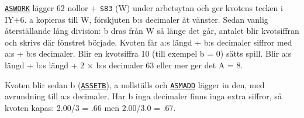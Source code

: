 \begin{Listing}
\Gap
{}
\begin{Note}\par\noindent \hyperlink{l:ASWORK}{\texttt{ASWORK}} lägger 62 nollor + \texttt{\$83} (W) under arbetsytan och ger kvotens tecken i IY+6. a kopieras till W, förskjuten b:s decimaler åt vänster. Sedan vanlig återställande lång division: b dras från W så länge det går, antalet blir kvotsiffran och skrivs där fönstret började. Kvoten får a:s längd + b:s decimaler siffror med a:s + b:s decimaler. Blir en kvotsiffra 10 (till exempel b = 0) sätts spill. Blir a:s längd + b:s längd + 2 × b:s decimaler 63 eller mer ger det A = 8.\par
\par\noindent Kvoten blir sedan b (\hyperlink{l:ASSETB}{\texttt{ASSETB}}), a nollställs och \hyperlink{l:ASMADD}{\texttt{ASMADD}} lägger in den, med avrundning till a:s decimaler. Har b inga decimaler finns inga extra siffror, så kvoten kapas: 2.00/3 = .66 men 2.00/3.0 = .67.\par\end{Note}

\end{Listing}
